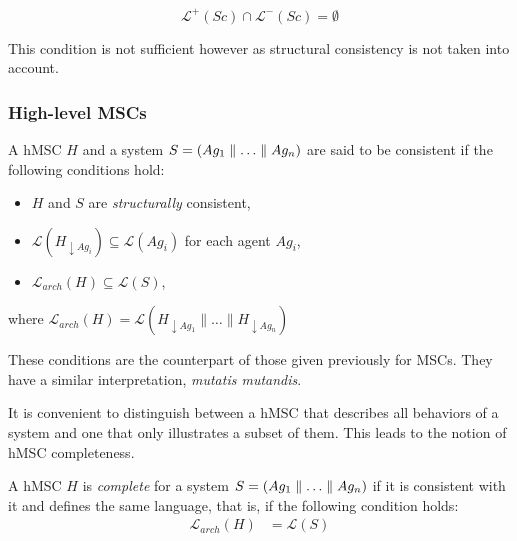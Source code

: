 \begin{equation}
\mathcal{L}^+(Sc) \cap \mathcal{L}^-(Sc) = \emptyset
\end{equation}

This condition is not sufficient however as structural consistency is not taken into account.

\subsubsection*{High-level MSCs}

A hMSC $H$ and a system $S = (Ag_1 \parallel \ldots \parallel Ag_n)$ are said to be consistent if the following conditions hold:
\begin{itemize}
\item $H$ and $S$ are \emph{structurally} consistent,
\item $\mathcal{L}(H_{\downarrow Ag_i}) \subseteq \mathcal{L}(Ag_i)$ for each agent $Ag_i$,
\item $\mathcal{L}_{arch}(H) \subseteq \mathcal{L}(S)$,
\end{itemize}
where $\mathcal{L}_{arch}(H) = \mathcal{L}(H_{\downarrow Ag_1} \parallel \ldots \parallel H_{\downarrow Ag_n})$

These conditions are the counterpart of those given previously for MSCs. They have a similar interpretation, \emph{mutatis mutandis}. 

It is convenient to distinguish between a hMSC that describes all behaviors of a system and one that only illustrates a subset of them. This leads to the notion of hMSC completeness. 

A hMSC $H$ is \emph{complete} for a system $S = (Ag_1 \parallel \ldots \parallel Ag_n)$ if it is consistent with it and defines the same language, that is, if the following condition holds:
\begin{align}
\mathcal{L}_{arch}(H) &= \mathcal{L}(S)
\end{align}

